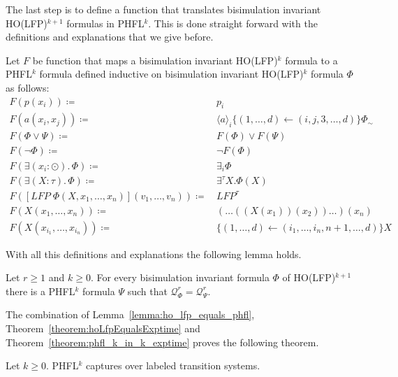 The last step is to define a function that translates bisimulation invariant HO(LFP)$^{k + 1}$ formulas in PHFL$^k$.
This is done straight forward with the definitions and explanations that we give before.

\begin{definition}
    Let $F$ be function that maps a bisimulation invariant HO(LFP)$^k$ formula to a PHFL$^k$ formula defined inductive
    on bisimulation invariant HO(LFP)$^k$ formula $\Phi$ as follows:
    \begin{align*}
        F(p(x_i)) \coloneqq &\, p_i \\
        F(a(x_i, x_j)) \coloneqq &\, \langle a \rangle_i \{(1, \dots, d) \leftarrow (i, j, 3, \dots, d)\} \Phi_\sim \\
        F(\Phi \vee \Psi) \coloneqq &\, F(\Phi) \vee F(\Psi) \\
        F(\neg \Phi) \coloneqq &\, \neg F(\Phi) \\
        F(\exists (x_i \colon \odot).\,\Phi) \coloneqq &\, \exists_i \Phi \\
        F(\exists (X \colon \tau).\,\Phi) \coloneqq &\, \exists^\tau X. \Phi(X) \\
        F([LFP\;\Phi(X, x_1, \dots, x_n)](v_1, \dots, v_n)) \coloneqq &\,LFP^\tau \\
        F(X(x_1, \dots, x_n)) \coloneqq &\, (\dots ((X(x_1))(x_2))\dots)(x_n)\\
        F(X(x_{i_1}, \dots, x_{i_n})) \coloneqq &\, \{(1, \dots, d) \leftarrow (i_1, \dots, i_n, n + 1, \dots, d)\}X
    \end{align*}
\end{definition}

With all this definitions and explanations the following lemma holds.

\begin{lemma}
    \label{lemma:ho_lfp_equals_phfl}
    Let $r \geq 1$ and $k \geq 0$. For every bisimulation invariant formula $\Phi$ of HO(LFP)$^{k + 1}$ there is a
    PHFL$^k$ formula $\Psi$ such that $\mathcal{Q}_\Phi^r = \mathcal{Q}_\Psi^r$.
\end{lemma}

The combination of Lemma~\ref{lemma:ho_lfp_equals_phfl}, Theorem~\ref{theorem:hoLfpEqualsExptime} and
Theorem~\ref{theorem:phfl_k_in_k_exptime} proves the following theorem.

\begin{theorem}
    Let $k \geq 0$. PHFL$^k$ captures  over labeled transition systems.
\end{theorem}

